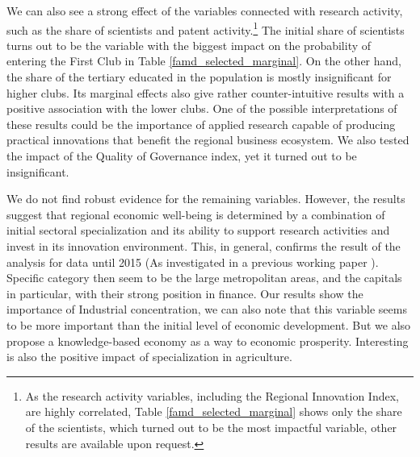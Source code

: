 \documentclass[11pt]{article}
\begin{document}
We can also see a strong effect of the variables connected with research activity, such as the share of scientists and patent activity.\footnote{As the research activity variables, including the Regional Innovation Index, are highly correlated, Table \ref{famd_selected_marginal} shows only the share of the scientists, which turned out to be the most impactful variable, other results are available upon request.} The initial share of scientists turns out to be the variable with the biggest impact on the probability of entering the First Club in Table \ref{famd_selected_marginal}.
On the other hand, the share of the tertiary educated in the population is mostly insignificant for higher clubs. Its marginal effects also give rather counter-intuitive results with a positive association with the lower clubs. One of the possible interpretations of these results could be the importance of applied research capable of producing practical innovations that benefit the regional business ecosystem. We also tested the impact of the Quality of Governance index, yet it turned out to be insignificant.

We do not find robust evidence for the remaining variables. However, the results suggest that regional economic well-being is determined by a combination of initial sectoral specialization and its ability to support research activities and invest in its innovation environment. This, in general, confirms the result of the analysis for data until 2015 (As investigated in a previous working paper \citep{pintera2021regional}). Specific category then seem to be the large metropolitan areas, and the capitals in particular, with their strong position in finance. Our results show the importance of Industrial concentration, we can also note that this variable seems to be more important than the initial level of economic development. But we also propose a knowledge-based economy as a way to economic prosperity.
Interesting is also the positive impact of specialization in agriculture. 
\end{document}
